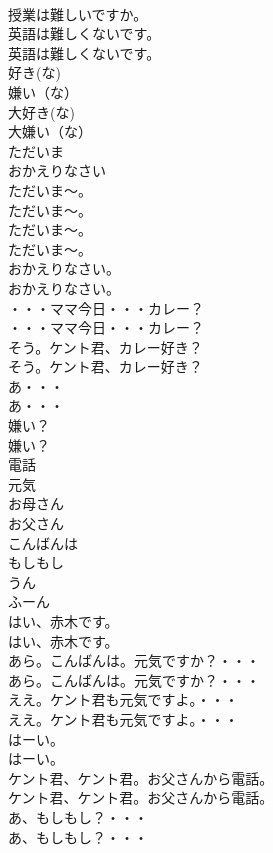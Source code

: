 \documentclass[8pt]{extreport}
\begin{document}
\begin{CJK}{UTF8}{min}
\\	授業は難しいですか。 
\\	英語は難しくないです。	
\\	英語は難しくないです。 
\\	好き(な)
\\	嫌い（な）
\\	大好き(な)
\\	大嫌い（な）
\\	ただいま
\\	おかえりなさい
\\	ただいま～。	
\\	ただいま～。 
\\	ただいま～。	
\\	ただいま～。 
\\	おかえりなさい。	
\\	おかえりなさい。 
\\	・・・ママ今日・・・カレー？	
\\	・・・ママ今日・・・カレー？ 
\\	そう。ケント君、カレー好き？	
\\	そう。ケント君、カレー好き？ 
\\	あ・・・	
\\	あ・・・ 
\\	嫌い？	
\\	嫌い？ 
\\	電話
\\	元気
\\	お母さん
\\	お父さん
\\	こんばんは
\\	もしもし
\\	うん
\\	ふーん
\\	はい、赤木です。	
\\	はい、赤木です。 
\\	あら。こんばんは。元気ですか？・・・	
\\	あら。こんばんは。元気ですか？・・・ 
\\	ええ。ケント君も元気ですよ。・・・	
\\	ええ。ケント君も元気ですよ。・・・ 
\\	はーい。	
\\	はーい。 
\\	ケント君、ケント君。お父さんから電話。	
\\	ケント君、ケント君。お父さんから電話。 
\\	あ、もしもし？・・・	
\\	あ、もしもし？・・・ 

\end{CJK}
\end{document}

